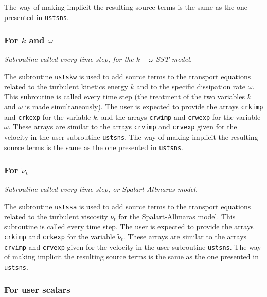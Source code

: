 {{{The way of making implicit the resulting source terms is the same as the
one presented in \texttt{ustsns}.

\subsubsection{For $k$ and $\omega$}

\noindent
\textit{Subroutine called every time step, for the $k-\omega$ SST model.}

The subroutine \texttt{ustskw} is used to add source terms to the transport equations
related to the turbulent kinetics energy $k$ and to the specific
dissipation rate $\omega$. This subroutine is
called every time step (the treatment of the two
variables $k$ and $\omega$ is made simultaneously). The user is expected
to provide the arrays \texttt{crkimp} and \texttt{crkexp} for the variable
$k$, and the arrays \texttt{crwimp} and \texttt{crwexp} for the variable $\omega$.
These arrays are similar to the arrays \texttt{crvimp} and \texttt{crvexp}
given for the velocity in the user subroutine \texttt{ustsns}. The way of
making implicit the resulting source terms is the same as the one presented in
\texttt{ustsns}.

\subsubsection{For $\tilde{\nu}_t$}

\noindent
\textit{Subroutine called every time step, or Spalart-Allmaras model.}

The subroutine \texttt{ustssa} is used to add source terms to the transport equations
related to the turbulent viscosity $\nu_t$ for the Spalart-Allmaras model.
This subroutine is called every time step. The user is expected
to provide the arrays \texttt{crkimp} and \texttt{crkexp} for the variable
$\tilde{\nu}_t$. These arrays are similar to the arrays \texttt{crvimp} and \texttt{crvexp}
given for the velocity in the user subroutine \texttt{ustsns}. The way of
making implicit the resulting source terms is the same as the one presented in
\texttt{ustsns}.

\subsubsection{For user scalars}

}}}
